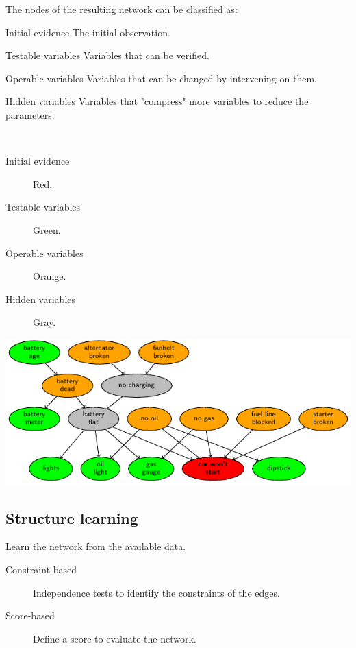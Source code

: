 The nodes of the resulting network can be classified as:
\begin{descriptionlist}
    \item[Initial evidence] The initial observation.
    \item[Testable variables] Variables that can be verified.
    \item[Operable variables] Variables that can be changed by intervening on them.
    \item[Hidden variables] Variables that "compress" more variables to reduce the parameters.
\end{descriptionlist}

\begin{example} \phantom{}\\
    \begin{minipage}{.4\linewidth}
        \begin{description}
            \item[Initial evidence] Red.
            \item[Testable variables] Green.
            \item[Operable variables] Orange.
            \item[Hidden variables] Gray.
        \end{description}
    \end{minipage}
    \begin{minipage}{.5\linewidth}
        \begin{center}
            \includegraphics[width=\linewidth]{img/_car_example.pdf}
        \end{center}
    \end{minipage}
\end{example}


\subsection{Structure learning}
Learn the network from the available data.
\begin{description}
    \item[Constraint-based] 
        Independence tests to identify the constraints of the edges.
    \item[Score-based] 
        Define a score to evaluate the network.
\end{description}



